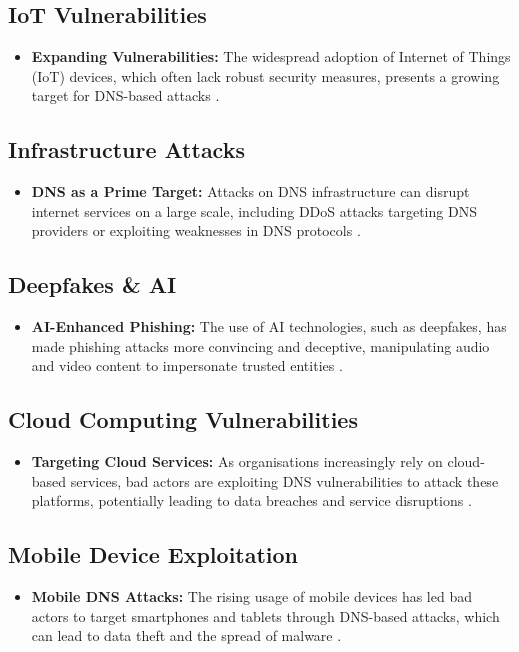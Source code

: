\subsection{IoT Vulnerabilities}
\begin{itemize}
    \item \textbf{Expanding Vulnerabilities:} The widespread adoption of Internet of Things (IoT) devices, which often lack robust security measures, presents a growing target for DNS-based attacks \cite{mahmoud2015internet}.
\end{itemize}

\subsection{Infrastructure Attacks}
\begin{itemize}
    \item \textbf{DNS as a Prime Target:} Attacks on DNS infrastructure can disrupt internet services on a large scale, including DDoS attacks targeting DNS providers or exploiting weaknesses in DNS protocols \cite{dooley2017dns}.
\end{itemize}

\subsection{Deepfakes \& AI}
\begin{itemize}
    \item \textbf{AI-Enhanced Phishing:} The use of AI technologies, such as deepfakes, has made phishing attacks more convincing and deceptive, manipulating audio and video content to impersonate trusted entities \cite{schick2020deep}.
\end{itemize}

\subsection{Cloud Computing Vulnerabilities}
\begin{itemize}
    \item \textbf{Targeting Cloud Services:} As organisations increasingly rely on cloud-based services, bad actors are exploiting DNS vulnerabilities to attack these platforms, potentially leading to data breaches and service disruptions \cite{mather2009cloud}.
\end{itemize}

\subsection{Mobile Device Exploitation}
\begin{itemize}
    \item \textbf{Mobile DNS Attacks:} The rising usage of mobile devices has led bad actors to target smartphones and tablets through DNS-based attacks, which can lead to data theft and the spread of malware \cite{au2016mobile}.
\end{itemize}

